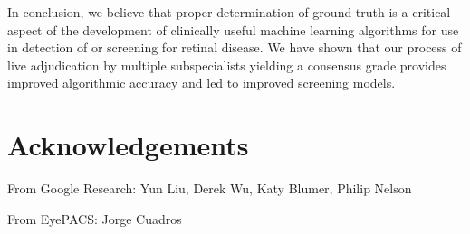 \documentclass{llncs}
\begin{document}
In conclusion, we believe that proper determination of ground truth is a critical aspect of the development of clinically useful machine learning algorithms for use in detection of or screening for retinal disease. We have shown that our process of live adjudication by multiple subspecialists yielding a consensus grade provides improved algorithmic accuracy and led to improved screening models.

\section{Acknowledgements}
From Google Research: Yun Liu, Derek Wu, Katy Blumer, Philip Nelson

\noindent
From EyePACS: Jorge Cuadros




\appendix

\FloatBarrier
\setcounter{table}{0}
\renewcommand{\thetable}{\arabic{table}}%
\setcounter{figure}{0}
\renewcommand{\thefigure}{\arabic{figure}}%

\newpage
\end{document}
